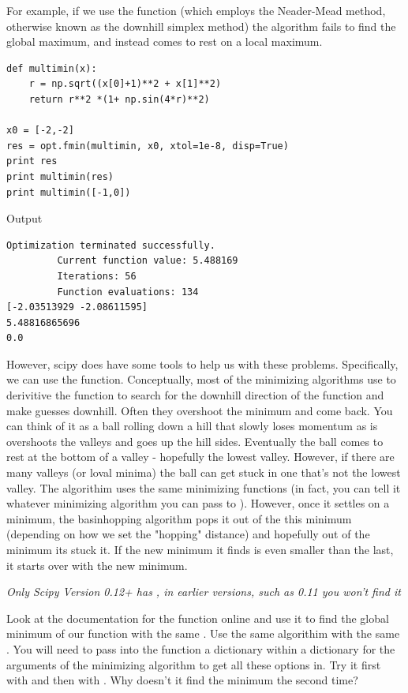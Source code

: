 For example, if we use the  function (which employs the Neader-Mead method, otherwise known as the downhill simplex method) the algorithm fails to find the global maximum, and instead comes to rest on a local maximum.
\begin{lstlisting}
def multimin(x):
    r = np.sqrt((x[0]+1)**2 + x[1]**2)
    return r**2 *(1+ np.sin(4*r)**2)

x0 = [-2,-2]
res = opt.fmin(multimin, x0, xtol=1e-8, disp=True)
print res
print multimin(res)
print multimin([-1,0])
\end{lstlisting}
Output
\begin{lstlisting}
Optimization terminated successfully.
         Current function value: 5.488169
         Iterations: 56
         Function evaluations: 134
[-2.03513929 -2.08611595]
5.48816865696
0.0
\end{lstlisting}

However, scipy does have some tools to help us with these problems. Specifically, we can use the  function. 
Conceptually, most of the minimizing algorithms use to derivitive the function to search for the downhill direction of the function and make guesses downhill. Often they overshoot the minimum and come back. You can think of it as a ball rolling down a hill that slowly loses momentum as is overshoots the valleys and goes up the hill sides. Eventually the ball comes to rest at the bottom of a valley - hopefully the lowest valley. However, if there are many valleys (or loval minima) the ball can get stuck in one that's not the lowest valley.
The  algorithim uses the same minimizing functions (in fact, you can tell it whatever minimizing algorithm you can pass to ). However, once it settles on a minimum, the basinhopping algorithm pops it out of the this minimum (depending on how we set the "hopping" distance)  and hopefully out of the minimum its stuck it. If the new minimum it finds is even smaller than the last, it starts over with the new minimum.

\emph{Only Scipy Version 0.12+ has , in earlier versions, such as 0.11 you won't find it}
\begin{problem}

Look at the documentation for the  function online and use it to find the global minimum of our function with the same . Use the same  algorithim with the same . You will need to pass into the  function a dictionary within a dictionary for the arguments of the minimizing algorithm to get all these options in.
Try it first with  and then with . Why doesn't it find the minimum the second time?

\end{problem}

